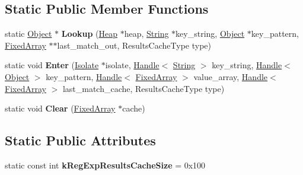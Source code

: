 \subsection*{Static Public Member Functions}
\begin{DoxyCompactItemize}
\item 
static \hyperlink{classv8_1_1internal_1_1_object}{Object} $\ast$ {\bfseries Lookup} (\hyperlink{classv8_1_1internal_1_1_heap}{Heap} $\ast$heap, \hyperlink{classv8_1_1internal_1_1_string}{String} $\ast$key\+\_\+string, \hyperlink{classv8_1_1internal_1_1_object}{Object} $\ast$key\+\_\+pattern, \hyperlink{classv8_1_1internal_1_1_fixed_array}{Fixed\+Array} $\ast$$\ast$last\+\_\+match\+\_\+out, Results\+Cache\+Type type)\hypertarget{classv8_1_1internal_1_1_reg_exp_results_cache_ad5c57672fb5d710a37f2f8a299560cff}{}\label{classv8_1_1internal_1_1_reg_exp_results_cache_ad5c57672fb5d710a37f2f8a299560cff}

\item 
static void {\bfseries Enter} (\hyperlink{classv8_1_1internal_1_1_isolate}{Isolate} $\ast$isolate, \hyperlink{classv8_1_1internal_1_1_handle}{Handle}$<$ \hyperlink{classv8_1_1internal_1_1_string}{String} $>$ key\+\_\+string, \hyperlink{classv8_1_1internal_1_1_handle}{Handle}$<$ \hyperlink{classv8_1_1internal_1_1_object}{Object} $>$ key\+\_\+pattern, \hyperlink{classv8_1_1internal_1_1_handle}{Handle}$<$ \hyperlink{classv8_1_1internal_1_1_fixed_array}{Fixed\+Array} $>$ value\+\_\+array, \hyperlink{classv8_1_1internal_1_1_handle}{Handle}$<$ \hyperlink{classv8_1_1internal_1_1_fixed_array}{Fixed\+Array} $>$ last\+\_\+match\+\_\+cache, Results\+Cache\+Type type)\hypertarget{classv8_1_1internal_1_1_reg_exp_results_cache_aeafd2342977a43afc254772a8bf8680a}{}\label{classv8_1_1internal_1_1_reg_exp_results_cache_aeafd2342977a43afc254772a8bf8680a}

\item 
static void {\bfseries Clear} (\hyperlink{classv8_1_1internal_1_1_fixed_array}{Fixed\+Array} $\ast$cache)\hypertarget{classv8_1_1internal_1_1_reg_exp_results_cache_ae866a4db3966af7978b3a0c1210d877f}{}\label{classv8_1_1internal_1_1_reg_exp_results_cache_ae866a4db3966af7978b3a0c1210d877f}

\end{DoxyCompactItemize}
\subsection*{Static Public Attributes}
\begin{DoxyCompactItemize}
\item 
static const int {\bfseries k\+Reg\+Exp\+Results\+Cache\+Size} = 0x100\hypertarget{classv8_1_1internal_1_1_reg_exp_results_cache_ad37862e92f47683bd89088d629b569c8}{}\label{classv8_1_1internal_1_1_reg_exp_results_cache_ad37862e92f47683bd89088d629b569c8}

\end{DoxyCompactItemize}
